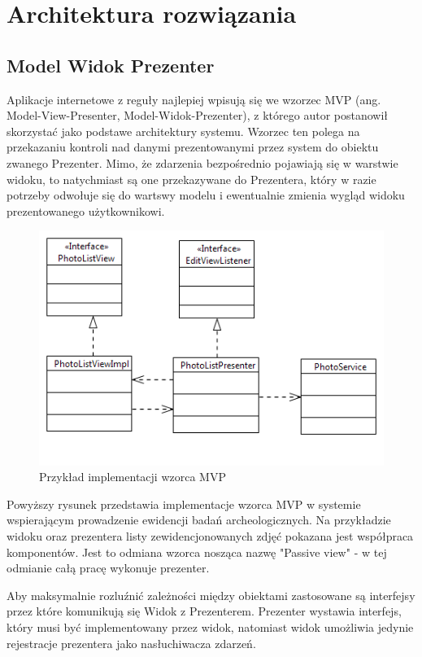 \chapter{Architektura rozwiązania}
\section{Model Widok Prezenter}
Aplikacje internetowe z reguły najlepiej wpisują się we wzorzec MVP (ang. Model-View-Presenter, Model-Widok-Prezenter), z którego autor postanowił skorzystać jako podstawe architektury systemu. Wzorzec ten polega na przekazaniu kontroli nad danymi prezentowanymi przez system do obiektu zwanego Prezenter. Mimo, że zdarzenia bezpośrednio pojawiają się w warstwie widoku, to natychmiast są one przekazywane do Prezentera, który w razie potrzeby odwołuje się do wartswy modelu i ewentualnie zmienia wygląd widoku prezentowanego użytkownikowi.

\begin{figure} [H]
    \begin{center}
	\includegraphics[scale=.8]{img/mvp.png}
	\caption{Przykład implementacji wzorca MVP}
	\label{mvp}
    \end{center}
\end{figure}

Powyższy rysunek przedstawia implementacje wzorca MVP w systemie wspierającym prowadzenie ewidencji badań archeologicznych. Na przykładzie widoku oraz prezentera listy zewidencjonowanych zdjęć pokazana jest współpraca komponentów. Jest to odmiana wzorca nosząca nazwę "Passive view" - w tej odmianie całą pracę wykonuje prezenter.

\newpage
Aby maksymalnie rozluźnić zależności między obiektami zastosowane są interfejsy przez które komunikują się Widok z Prezenterem. Prezenter wystawia interfejs, który musi być implementowany przez widok, natomiast widok umożliwia jedynie rejestracje prezentera jako nasłuchiwacza zdarzeń. 

